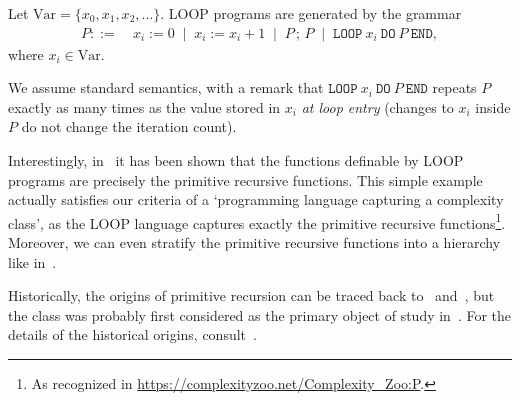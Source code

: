 \begin{definition}
Let \(\mathrm{Var}=\{x_0,x_1,x_2,\dots\}\).
LOOP programs are generated by the grammar
\[
\begin{aligned}
P ::=~& x_i := 0
\;\mid\; x_i := x_i + 1
\;\mid\; P \,;\, P
\;\mid\; \texttt{LOOP}~x_i~\texttt{DO}~P~\texttt{END},
\end{aligned}
\]
where \(x_i\in\mathrm{Var}\).

\noindent
We assume standard semantics, with a remark that \(\texttt{LOOP}~x_i~\texttt{DO}~P~\texttt{END}\) repeats \(P\) exactly as many times as the value stored in \(x_i\) \emph{at loop entry} (changes to \(x_i\) inside \(P\) do not change the iteration count).
\end{definition}

Interestingly, in~\cite{10.1145/800196.806014} it has been shown that the functions definable by LOOP programs
are precisely the primitive recursive functions.
This simple example actually satisfies our criteria of a `programming language capturing a complexity class', as
the LOOP language captures exactly the primitive recursive functions\footnote{As recognized in \url{https://complexityzoo.net/Complexity_Zoo:P}.}.
Moreover, we can even stratify the primitive recursive functions into a hierarchy like in~\cite{Grzegorczyk1953}.


Historically, the origins of primitive recursion can be traced back to~\cite{Grassmann1861} and~\cite{Dedekind1888},
but the class was probably first considered as the primary object of study in~\cite{Skolem1923-vanHeijenoort}.
For the details of the historical origins, consult~\cite{Adams2011}.
